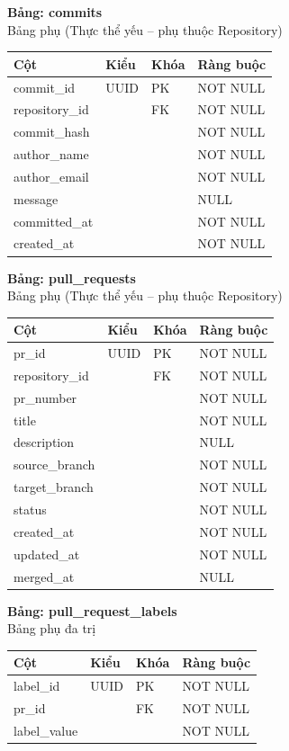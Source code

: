 \textbf{Bảng: commits}\\
Bảng phụ (Thực thể yếu – phụ thuộc Repository)
\begin{table}[H]
\centering
\begin{tabular}{|l|l|l|l|}
\hline
\textbf{Cột} & \textbf{Kiểu} & \textbf{Khóa} & \textbf{Ràng buộc} \\ \hline
commit\_id & UUID & PK & NOT NULL \\ \hline
repository\_id & & FK & NOT NULL \\ \hline
commit\_hash & & & NOT NULL \\ \hline
author\_name & & & NOT NULL \\ \hline
author\_email & & & NOT NULL \\ \hline
message & & & NULL \\ \hline
committed\_at & & & NOT NULL \\ \hline
created\_at & & & NOT NULL \\ \hline
\end{tabular}
\end{table}

\textbf{Bảng: pull\_requests}\\
Bảng phụ (Thực thể yếu – phụ thuộc Repository)
\begin{table}[H]
\centering
\begin{tabular}{|l|l|l|l|}
\hline
\textbf{Cột} & \textbf{Kiểu} & \textbf{Khóa} & \textbf{Ràng buộc} \\ \hline
pr\_id & UUID & PK & NOT NULL \\ \hline
repository\_id & & FK & NOT NULL \\ \hline
pr\_number & & & NOT NULL \\ \hline
title & & & NOT NULL \\ \hline
description & & & NULL \\ \hline
source\_branch & & & NOT NULL \\ \hline
target\_branch & & & NOT NULL \\ \hline
status & & & NOT NULL \\ \hline
created\_at & & & NOT NULL \\ \hline
updated\_at & & & NOT NULL \\ \hline
merged\_at & & & NULL \\ \hline
\end{tabular}
\end{table}

\textbf{Bảng: pull\_request\_labels}\\
Bảng phụ đa trị
\begin{table}[H]
\centering
\begin{tabular}{|l|l|l|l|}
\hline
\textbf{Cột} & \textbf{Kiểu} & \textbf{Khóa} & \textbf{Ràng buộc} \\ \hline
label\_id & UUID & PK & NOT NULL \\ \hline
pr\_id & & FK & NOT NULL \\ \hline
label\_value & & & NOT NULL \\ \hline
\end{tabular}
\end{table}

